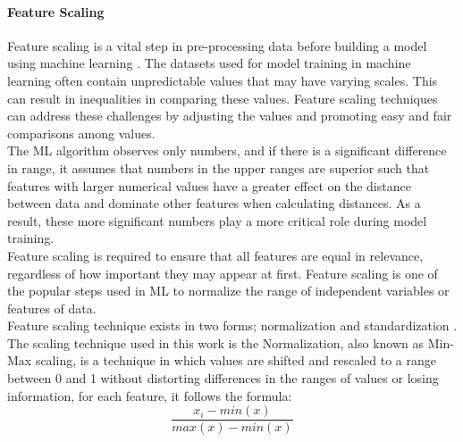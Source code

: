 \documentclass[runningheads]{llncs}
\begin{document}
\paragraph{Feature Scaling}
Feature scaling is a vital step in pre-processing data before building a model using machine learning  \cite{ref_paper6}. The datasets used for model training in machine learning often contain unpredictable values that may have varying scales. This can result in inequalities in comparing these values. Feature scaling techniques can address these challenges by adjusting the values and promoting easy and fair comparisons among values.\\
The ML algorithm observes only numbers, and if there is a significant difference in range, it assumes that numbers in the upper ranges are superior such that features with larger numerical values have a greater effect on the distance between data and dominate other features when calculating distances. As a result, these more significant numbers play a more critical role during model training.\\
Feature scaling is required to ensure that all features are equal in relevance, regardless of how important they may appear at first. Feature scaling is one of the popular steps used in ML to normalize the range of independent variables or features of data.\\
Feature scaling technique exists in two forms; normalization and standardization \cite{ref_paper7}. The scaling technique used in this work is the Normalization, also known as Min-Max scaling, is a technique in which values are shifted and rescaled to a range between 0 and 1 without distorting differences in the ranges of values or losing information, for each feature, it follows the formula:
\begin{equation}
\frac{x_i - min(x)}{max(x) - min(x)}
\end{equation}
\\
\end{document}
